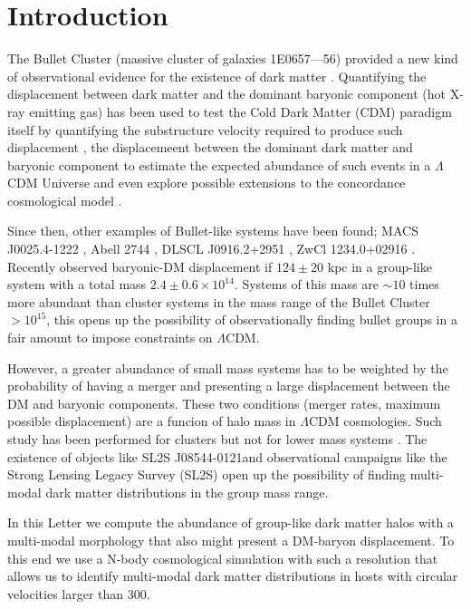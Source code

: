 \documentclass{emulateapj}
\newcommand{\hMsun}{{\ifmmode{h^{-1}{\rm {M_{\odot}}}}\else{$h^{-1}{\rm{M_{\odot}}}$}\fi}}
\newcommand{\Msun}{{\ifmmode{{\rm {M_{\odot}}}}\else{${\rm{M_{\odot}}}$}\fi}}
\newcommand{\kms}{{\ifmmode{{\mathrm{\,km\ s}^{-1}}}\else{\,km~s$^{-1}$}\fi}}
\newcommand{\bulla}{1E0657---56}
\newcommand{\bullg}{SL2S J08544-0121}
\begin{document}
\section{Introduction}


The Bullet Cluster (massive cluster of galaxies \bulla) provided a new
kind of observational evidence for the existence of dark matter
\citep{Markevitch2004,Clowe2006}. Quantifying the displacement between
dark matter and the dominant baryonic component (hot X-ray emitting gas)
has been used to test the Cold Dark Matter (CDM)
paradigm itself by quantifying the substructure velocity required to
produce such displacement \citep{Hayashi2006, Springel2007,
  Thompson2012}, the displacemeent between the dominant dark matter
and baryonic component \citep{ForeroRomero2010} to estimate the
expected abundance of such events in a $\Lambda$CDM Universe and even
explore possible extensions to the concordance cosmological model
\citep{Farrar2007,Lee2010,Lee2012}.    


Since then, other examples of Bullet-like systems have been found; 
MACS J0025.4-1222 \citep{Bradac2008}, Abell 2744 \citep{Merten2011},
DLSCL J0916.2+2951 \citep{Dawson2012}, ZwCl 1234.0+02916
\citep{Dahle2013}. Recently \citep{Gastaldello} observed baryonic-DM
displacement if $124\pm 20$ kpc in a group-like system with a total
mass $2.4\pm 0.6 \times 10^{14}$\Msun. Systems of this mass are
$\sim10$ times more abundant than cluster systems in the mass range of
the Bullet Cluster $>10^{15}$\hMsun, this opens up the possibility of
observationally finding bullet groups in a fair amount to impose
constraints on $\Lambda$CDM. 


However, a greater abundance of small mass systems has to be weighted
by the probability of having a merger and 
presenting a large displacement between the DM and baryonic
components. These two conditions (merger rates, maximum possible
displacement) are a funcion of halo mass in $\Lambda$CDM
cosmologies.  Such study has been performed for clusters but not for
lower mass systems \citep{ForeroRomero2010}. The existence of objects
like \bullg and observational campaigns like the Strong Lensing Legacy
Survey (SL2S) open up the possibility of finding multi-modal dark
matter distributions in the group mass range.


In this Letter we compute the abundance of group-like dark
matter halos with a multi-modal morphology that also might present a
DM-baryon displacement. To this end we use a N-body cosmological
simulation with such a resolution that allows us to identify
multi-modal dark matter distributions in hosts with circular velocities
larger than $300$\kms.  
\end{document}
